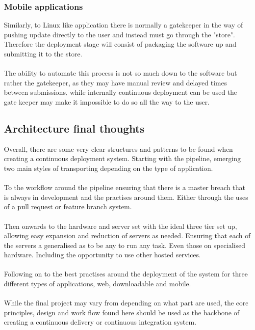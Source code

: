 \subsubsection{Mobile applications}

Similarly, to Linux like application there is normally a gatekeeper in the way of pushing update directly to the user and instead must go through the "store". Therefore the deployment stage will consist of packaging the software up and submitting it to the store. 
\\\\
The ability to automate this process is not so much down to the software but rather the gatekeeper, as they may have manual review and delayed times between submissions, while internally continuous deployment can be used the gate keeper may make it impossible to do so all the way to the user.

\subsection{Architecture final thoughts}

Overall, there are some very clear structures and patterns to be found when creating a continuous deployment system. Starting with the pipeline, emerging two main styles of transporting depending on the type of application.
\\\\
To the workflow around the pipeline ensuring that there is a master breach that is always in development and the practises around them. Either through the uses of a pull request or feature branch system.
\\\\
Then onwards to the hardware and server set with the ideal three tier set up, allowing easy expansion and reduction of servers as needed. Ensuring that each of the servers a generalised as to be any to run any task. Even those on specialised hardware. Including the opportunity to use other hosted services.
\\\\
Following on to the best practises around the deployment of the system for three different types of applications, web, downloadable and mobile.  
\\\\
While the final project may vary from depending on what part are used, the core principles, design and work flow found here should be used as the backbone of creating a continuous delivery or continuous integration system.